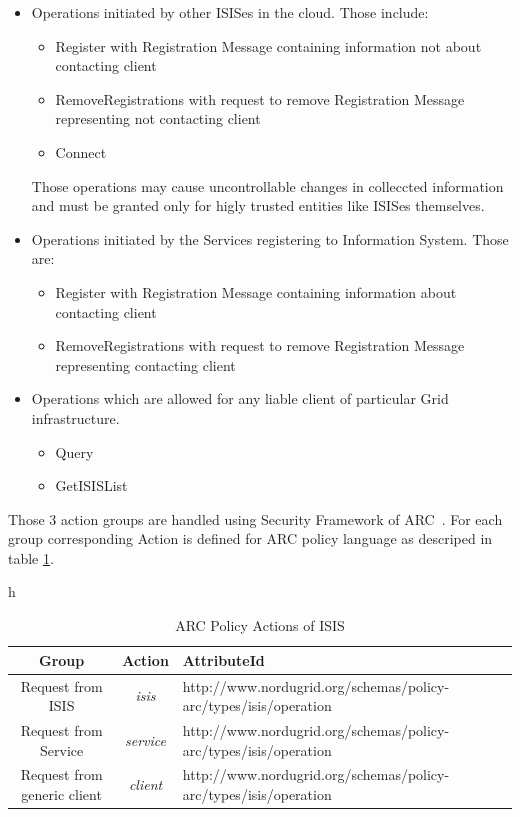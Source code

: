 \documentclass{book}
\begin{document}
\begin{itemize}
 \item Operations initiated by other ISISes in the cloud. Those include:
 \begin{itemize}
  \item Register with Registration Message containing information not about contacting client
  \item RemoveRegistrations with request to remove Registration Message representing not contacting client
  \item Connect %
 \end{itemize}

 Those operations may cause uncontrollable changes in colleccted information and must be granted only for higly trusted entities like ISISes themselves.

 \item Operations initiated by the Services registering to Information System. Those are:
 \begin{itemize}
  \item Register with Registration Message containing information about contacting client
  \item RemoveRegistrations with request to remove Registration Message representing contacting client
 \end{itemize}

 \item Operations which are allowed for any liable client of particular Grid infrastructure.
 \begin{itemize}
  \item Query
  \item GetISISList
 \end{itemize}
\end{itemize}

Those 3 action groups are handled using Security Framework of ARC~\cite{arcsec}. For each group corresponding 
Action is defined for ARC policy language as descriped in table \ref{tab:policy_actions}.

\begin{table}{h}
\caption{ARC Policy Actions of ISIS}
\label{tab:policy_actions}
\begin{tabular}{|c|c|l|}
\hline
\textbf{Group}&\textbf{Action}&\textbf{AttributeId}\\
\hline
Request from ISIS&\textit{isis}&http://www.nordugrid.org/schemas/policy-arc/types/isis/operation\\
\hline
Request from Service&\textit{service}&http://www.nordugrid.org/schemas/policy-arc/types/isis/operation\\
\hline
Request from generic client&\textit{client}&http://www.nordugrid.org/schemas/policy-arc/types/isis/operation\\
\hline
\end{tabular}
\end{table}
\end{document}
